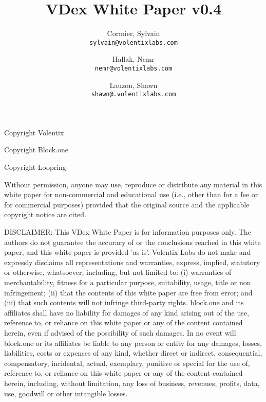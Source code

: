 \documentclass[]{article}
\title{VDex White Paper v0.4}
\author{
	Cormier, Sylvain\\
	\texttt{sylvain@volentixlabs.com}
	\and
	Hallak, Nemr\\
	\texttt{nemr@volentixlabs.com}
	\and
	Lauzon, Shawn\\
	\texttt{shawn@.volentixlabs.com}
}
\begin{document}
\tableofcontents
\maketitle
\begin{description}
\item Copyright  Volentix
\item Copyright  Block.one
\item Copyright  Loopring
\end{description}

{\tiny Without permission, anyone may use, reproduce or distribute any material in this white paper for non-commercial and educational use (i.e., other than for a fee or for commercial purposes) provided that the original source and the applicable copyright notice are cited.

DISCLAIMER: This VDex White Paper  is for information purposes only. The authors do not guarantee the accuracy of or the conclusions reached in this white paper, and this white paper is provided 'as is'. 
Volentix Labs do not make and expressly disclaims all representations and warranties, express, implied, statutory or otherwise, whatsoever, including, but not limited to: (i) warranties of merchantability, fitness for a particular purpose, suitability, usage, title or non infringement; (ii) that the contents of this white paper are free from error; and (iii) that such contents will not infringe third-party rights. block.one and its affiliates shall have no liability for damages of any kind arising out of the use, reference to, or reliance on this white paper or any of the content contained herein, even if advised of the possibility of such damages. In no event will block.one or its affiliates be liable to any person or entity for any damages, losses, liabilities, costs or expenses of any kind, whether direct or indirect, consequential, compensatory, incidental, actual, exemplary, punitive or special for the use of, reference to, or reliance on this white paper or any of the content contained herein, including, without limitation, any loss of business, revenues, profits, data, use, goodwill or other intangible losses.}
\end{document}
